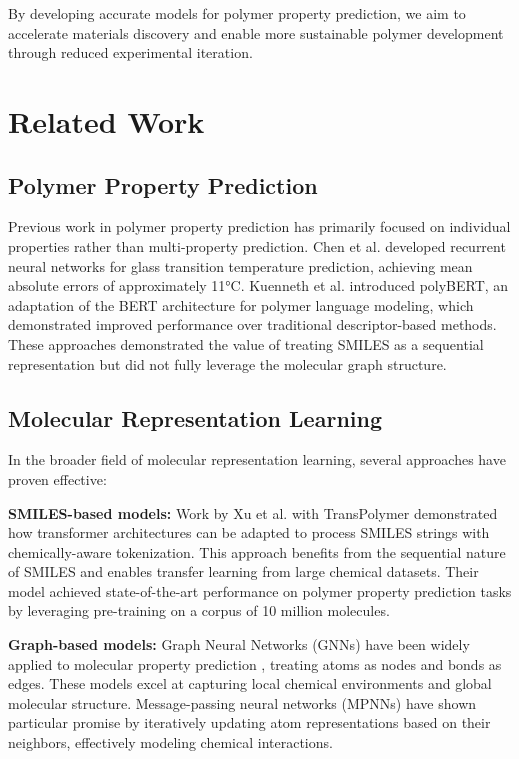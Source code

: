 \documentclass[10pt,twocolumn,letterpaper]{article}
\begin{document}
By developing accurate models for polymer property prediction, we aim to accelerate materials discovery and enable more sustainable polymer development through reduced experimental iteration.

\section{Related Work}

\subsection{Polymer Property Prediction}

Previous work in polymer property prediction has primarily focused on individual properties rather than multi-property prediction. Chen et al. \cite{chen2019} developed recurrent neural networks for glass transition temperature prediction, achieving mean absolute errors of approximately 11°C. Kuenneth et al. \cite{kuenneth2021} introduced polyBERT, an adaptation of the BERT architecture for polymer language modeling, which demonstrated improved performance over traditional descriptor-based methods. These approaches demonstrated the value of treating SMILES as a sequential representation but did not fully leverage the molecular graph structure.

\subsection{Molecular Representation Learning}

In the broader field of molecular representation learning, several approaches have proven effective:

\textbf{SMILES-based models:} Work by Xu et al. \cite{xu2020} with TransPolymer demonstrated how transformer architectures can be adapted to process SMILES strings with chemically-aware tokenization. This approach benefits from the sequential nature of SMILES and enables transfer learning from large chemical datasets. Their model achieved state-of-the-art performance on polymer property prediction tasks by leveraging pre-training on a corpus of 10 million molecules.

\textbf{Graph-based models:} Graph Neural Networks (GNNs) have been widely applied to molecular property prediction \cite{xiong2019}, treating atoms as nodes and bonds as edges. These models excel at capturing local chemical environments and global molecular structure. Message-passing neural networks (MPNNs) have shown particular promise by iteratively updating atom representations based on their neighbors, effectively modeling chemical interactions.
\end{document}
